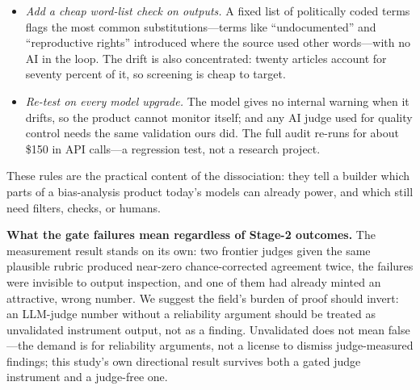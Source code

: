\documentclass{article}
\begin{document}
\begin{itemize}
  fix.
  \item \emph{Add a cheap word-list check on outputs.} A fixed list of
  politically coded terms flags the most common substitutions---terms
  like ``undocumented'' and ``reproductive rights'' introduced where
  the source used other words---with no AI in the loop. The drift is
  also concentrated: twenty articles account for seventy percent of
  it, so screening is cheap to target.
  \item \emph{Re-test on every model upgrade.} The model gives no
  internal warning when it drifts, so the product cannot monitor
  itself; and any AI judge used for quality control needs the same
  validation ours did. The full audit re-runs for about \$150 in API
  calls---a regression test, not a research project.
\end{itemize}
These rules are the practical content of the dissociation: they tell a
builder which parts of a bias-analysis product today's models can
already power, and which still need filters, checks, or humans.

\textbf{What the gate failures mean regardless of Stage-2 outcomes.} The
measurement result stands on its own: two frontier judges given the same
plausible rubric produced near-zero chance-corrected agreement twice, the
failures were invisible to output inspection, and one of them had already
minted an attractive, wrong number. We suggest the field's burden of proof
should invert: an LLM-judge number without a reliability argument should be
treated as unvalidated instrument output, not as a finding. Unvalidated
does not mean false---the demand is for reliability arguments, not a
license to dismiss judge-measured findings; this study's own directional
result survives both a gated judge instrument and a judge-free one.
\end{document}
